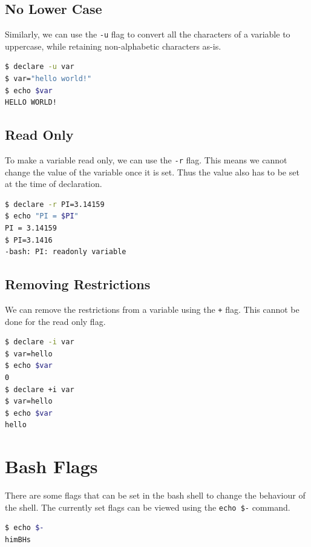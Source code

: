 \subsection{No Lower Case}

Similarly, we can use the \lstinline{-u} flag to convert all the characters of a variable to uppercase, while retaining non-alphabetic characters as-is.

\begin{lstlisting}[language=bash]
$ declare -u var
$ var="hello world!"
$ echo $var
HELLO WORLD!
\end{lstlisting}

\subsection{Read Only}

To make a variable read only, we can use the \lstinline{-r} flag.
This means we cannot change the value of the variable once it is set.
Thus the value also has to be set at the time of declaration.

\begin{lstlisting}[language=bash]
$ declare -r PI=3.14159
$ echo "PI = $PI"
PI = 3.14159
$ PI=3.1416
-bash: PI: readonly variable
\end{lstlisting}

\subsection{Removing Restrictions}

We can remove the restrictions from a variable using the \lstinline{+} flag.
This cannot be done for the read only flag.

\begin{lstlisting}[language=bash]
$ declare -i var
$ var=hello
$ echo $var
0
$ declare +i var
$ var=hello
$ echo $var
hello
\end{lstlisting}

\section{Bash Flags}

There are some flags that can be set in the bash shell to change the behaviour of the shell.
The currently set flags can be viewed using the \lstinline{echo $-} command.

\begin{lstlisting}[language=bash]
$ echo $-
himBHs
\end{lstlisting}

